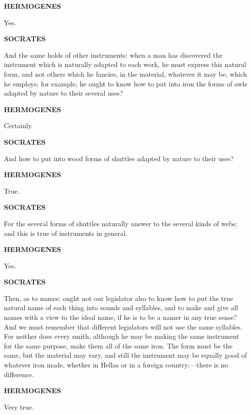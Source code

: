 \documentclass[11pt,letter]{article}
\begin{document}
\par \textbf{HERMOGENES}
\par   Yes.

\par \textbf{SOCRATES}
\par   And the same holds of other instruments:  when a man has discovered the instrument which is naturally adapted to each work, he must express this natural form, and not others which he fancies, in the material, whatever it may be, which he employs; for example, he ought to know how to put into iron the forms of awls adapted by nature to their several uses?

\par \textbf{HERMOGENES}
\par   Certainly.

\par \textbf{SOCRATES}
\par   And how to put into wood forms of shuttles adapted by nature to their uses?

\par \textbf{HERMOGENES}
\par   True.

\par \textbf{SOCRATES}
\par   For the several forms of shuttles naturally answer to the several kinds of webs; and this is true of instruments in general.

\par \textbf{HERMOGENES}
\par   Yes.

\par \textbf{SOCRATES}
\par   Then, as to names:  ought not our legislator also to know how to put the true natural name of each thing into sounds and syllables, and to make and give all names with a view to the ideal name, if he is to be a namer in any true sense? And we must remember that different legislators will not use the same syllables. For neither does every smith, although he may be making the same instrument for the same purpose, make them all of the same iron. The form must be the same, but the material may vary, and still the instrument may be equally good of whatever iron made, whether in Hellas or in a foreign country;—there is no difference.

\par \textbf{HERMOGENES}
\par   Very true.
\end{document}
